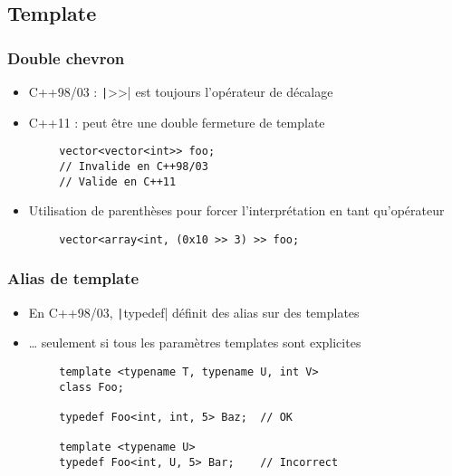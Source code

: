 \documentclass[C++.tex]{subfiles}
\begin{document}
\subsection*{Template}
\begin{frame}[fragile]
	\frametitle{Double chevron}
	\begin{itemize}
		\item C++98/03 : \texttt|>>| est toujours l'opérateur de décalage
		\item C++11 : peut être une double fermeture de template
	\end{itemize}

	\begin{verbatim}
		vector<vector<int>> foo;
		// Invalide en C++98/03
		// Valide en C++11
	\end{verbatim}


	\begin{itemize}
		\item Utilisation de parenthèses pour forcer l'interprétation en tant qu'opérateur
	\end{itemize}

	\begin{verbatim}
		vector<array<int, (0x10 >> 3) >> foo;
	\end{verbatim}
\end{frame}

\begin{frame}[fragile]
	\frametitle{Alias de template}
	\begin{itemize}
		\item En C++98/03, \texttt|typedef| définit des alias sur des templates
		\item \ldots{} seulement si tous les paramètres templates sont explicites
	\end{itemize}

	\begin{verbatim}
		template <typename T, typename U, int V>
		class Foo;

		typedef Foo<int, int, 5> Baz;  // OK

		template <typename U>
		typedef Foo<int, U, 5> Bar;    // Incorrect
	\end{verbatim}
\end{frame}
\end{document}
